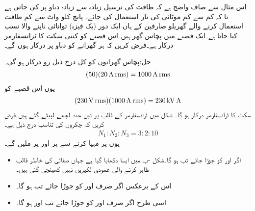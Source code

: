 اس مثال سے صاف واضح ہے کہ طاقت کی ترسیل زیادہ سے زیادہ دباو پر کی جاتی ہے تا کہ کم سے کم موٹائی کی تار استعمال کی جائے۔
پانچ کلو واٹ سے کم طاقت استعمال کرنے والے گھریلو صارفین کے ہاں ایک دور (یک فیزہ) توانائی ناپنے والا  نسب کیا جاتا ہے۔ایک قصبے میں پچاس گھر ہیں۔اس قصبے کو کتنی سکت کا ٹرانسفارمر درکار ہے۔فرض کریں کہ ہر گھرانے کو  دباو پر  درکار ہوں گے۔

حل:پچاس گھرانوں کو کل درج ذیل رو درکار ہو گی۔
\begin{align*}
(50)(\SI{20}{\ampere}\,{\textup{rms}})=\SI{1000}{\ampere}\,{\textup{rms}}
\end{align*}
یوں اس قصبے کو
\begin{align*}
(\SI{230}{\volt}\,{\textup{rms}})(\SI{1000}{\ampere}\,{\textup{rms}})=\SI{230}{\kilo\volt\ampere}
\end{align*}
سکت کا ٹرانسفارمر درکار ہو گا۔
شکل  میں ٹرانسفارمر کے قالب پر تین عدد لچھے لپیٹے گئے ہیں۔فرض کریں کہ چکروں کی تناسب درج ذیل ہے۔
\begin{align*}
N_1:N_2:N_3=3:2:10
\end{align*}
 یوں  پر  مہیا کرنے سے  پر  اور  پر  ملیں گے۔
\begin{itemize}
\item
اگر  اور  کو جوڑا جائے تب  ہو گا۔شکل -ب میں ایسا دکھایا گیا ہے  جہاں صفائی کی خاطر قالب ظاہر کرنے والی عمودی لکیریں نہیں کھینچی گئی ہیں۔
\item
اس کے برعکس اگر صرف  اور  کو جوڑا جائے تب  ہو گا۔
\item
اسی طرح  اگر صرف  اور  کو جوڑا جائے تب  اور  ہو گا۔
\end{itemize}

